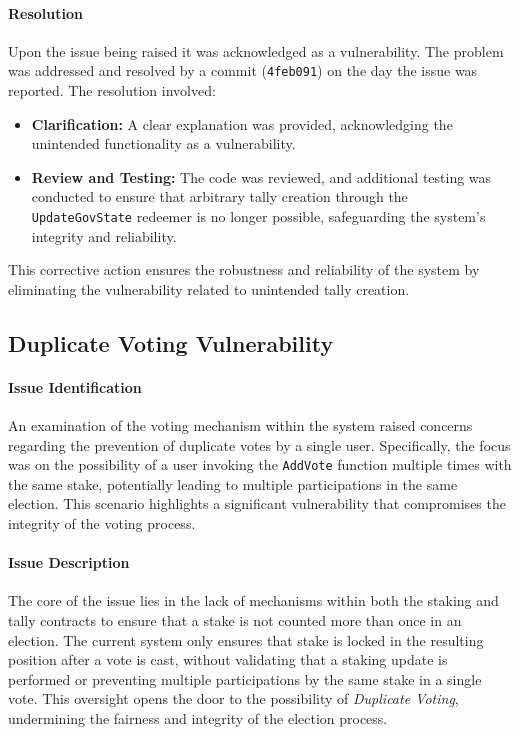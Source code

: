 \documentclass[11pt]{article}
\begin{document}
\paragraph{Resolution}
Upon the issue being raised it was acknowledged as a vulnerability.
The problem was addressed and resolved by a commit (\texttt{4feb091}) on the day the issue was reported.
The resolution involved:
\begin{itemize}
    \item \textbf{Clarification:} A clear explanation was provided, acknowledging the unintended functionality as a vulnerability.
    \item \textbf{Review and Testing:} The code was reviewed, and additional testing was conducted to ensure that arbitrary tally creation through the \texttt{UpdateGovState} redeemer is no longer possible, safeguarding the system's integrity and reliability.
\end{itemize}
This corrective action ensures the robustness and reliability of the system by eliminating the vulnerability related to unintended tally creation.

\subsection{Duplicate Voting Vulnerability}

\paragraph{Issue Identification}
An examination of the voting mechanism within the system raised concerns regarding the prevention of duplicate votes by a single user.
Specifically, the focus was on the possibility of a user invoking the \texttt{AddVote} function multiple times with the same stake, potentially leading to multiple participations in the same election.
This scenario highlights a significant vulnerability that compromises the integrity of the voting process.

\paragraph{Issue Description}
The core of the issue lies in the lack of mechanisms within both the staking and tally contracts to ensure that a stake is not counted more than once in an election.
The current system only ensures that stake is locked in the resulting position after a vote is cast, without validating that a staking update is performed or preventing multiple participations by the same stake in a single vote.
This oversight opens the door to the possibility of \textit{Duplicate Voting}, undermining the fairness and integrity of the election process.
\end{document}
